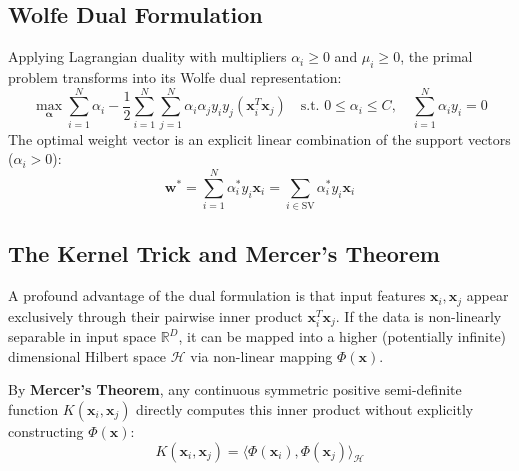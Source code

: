 \documentclass[12pt]{article}
\begin{document}
\subsection{Wolfe Dual Formulation}
Applying Lagrangian duality with multipliers $\alpha_i \ge 0$ and $\mu_i \ge 0$, the primal problem transforms into its Wolfe dual representation:
\begin{equation}
    \max_{\boldsymbol{\alpha}} \sum_{i=1}^{N} \alpha_i - \frac{1}{2} \sum_{i=1}^{N} \sum_{j=1}^{N} \alpha_i \alpha_j y_i y_j (\mathbf{x}_i^T \mathbf{x}_j) \quad \text{s.t. } 0 \le \alpha_i \le C, \quad \sum_{i=1}^{N} \alpha_i y_i = 0
\end{equation}
The optimal weight vector is an explicit linear combination of the support vectors ($\alpha_i > 0$):
\begin{equation}
    \mathbf{w}^* = \sum_{i=1}^{N} \alpha_i^* y_i \mathbf{x}_i = \sum_{i \in \text{SV}} \alpha_i^* y_i \mathbf{x}_i
\end{equation}

\subsection{The Kernel Trick and Mercer's Theorem}
A profound advantage of the dual formulation is that input features $\mathbf{x}_i, \mathbf{x}_j$ appear exclusively through their pairwise inner product $\mathbf{x}_i^T \mathbf{x}_j$. If the data is non-linearly separable in input space $\mathbb{R}^D$, it can be mapped into a higher (potentially infinite) dimensional Hilbert space $\mathcal{H}$ via non-linear mapping $\Phi(\mathbf{x})$.

By \textbf{Mercer's Theorem}, any continuous symmetric positive semi-definite function $K(\mathbf{x}_i, \mathbf{x}_j)$ directly computes this inner product without explicitly constructing $\Phi(\mathbf{x})$:
\begin{equation}
    K(\mathbf{x}_i, \mathbf{x}_j) = \langle \Phi(\mathbf{x}_i), \Phi(\mathbf{x}_j) \rangle_{\mathcal{H}}
\end{equation}
\end{document}
